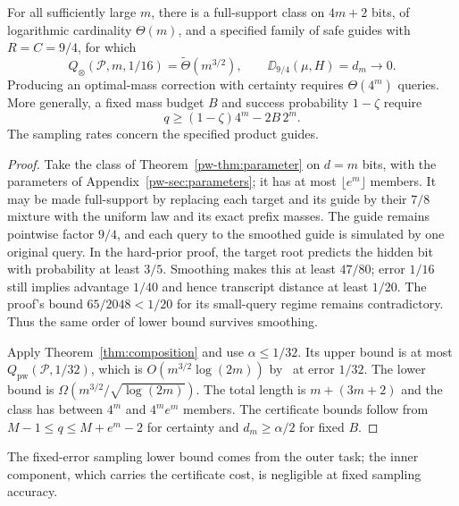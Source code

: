 \begin{corollary}\label{cor:fixed-cert}
For all sufficiently large $m$, there is a full-support class on $4m+2$ bits, of logarithmic cardinality $\Theta(m)$, and a specified family of safe guides with $R=C=9/4$, for which
\[
 Q_\otimes(\mathcal P,m,1/16)=\widetilde\Theta(m^{3/2}),
 \qquad \DD_{9/4}(\mu,H)=d_m\longrightarrow0.
\]
Producing an optimal-mass correction with certainty requires $\Theta(4^m)$ queries. More generally, a fixed mass budget $B$ and success probability $1-\zeta$ require
\[
 q\ge(1-\zeta)4^m-2B\,2^m.
\]
The sampling rates concern the specified product guides.
\end{corollary}
\begin{proof}
Take the class of Theorem~\ref{pw-thm:parameter} on $d=m$ bits, with the parameters of Appendix~\ref{pw-sec:parameters}; it has at most $\lfloor e^m\rfloor$ members. It may be made full-support by replacing each target and its guide by their $7/8$ mixture with the uniform law and its exact prefix masses. The guide remains pointwise factor $9/4$, and each query to the smoothed guide is simulated by one original query. In the hard-prior proof, the target root predicts the hidden bit with probability at least $3/5$. Smoothing makes this at least $47/80$; error $1/16$ still implies advantage $1/40$ and hence transcript distance at least $1/20$. The proof's bound $65/2048<1/20$ for its small-query regime remains contradictory. Thus the same order of lower bound survives smoothing.

Apply Theorem~\ref{thm:composition} and use $\alpha\le1/32$. Its upper bound is at most $Q_{\mathrm{pw}}(\mathcal P,1/32)$, which is $O(m^{3/2}\log(2m))$ by~\cite[Theorem 3.2]{gmr} at error $1/32$. The lower bound is $\Omega(m^{3/2}/\sqrt{\log(2m)})$. The total length is $m+(3m+2)$ and the class has between $4^m$ and $4^m e^m$ members. The certificate bounds follow from $M-1\le q\le M+e^m-2$ for certainty and $d_m\ge\alpha/2$ for fixed $B$.
\end{proof}

The fixed-error sampling lower bound comes from the outer task; the inner component, which carries the certificate cost, is negligible at fixed sampling accuracy.
